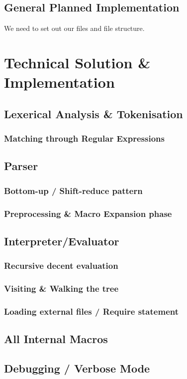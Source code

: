 \documentclass{article}
\begin{document}
    \clearpage
  \subsection{General Planned Implementation}
    We need to set out our files and file structure.


\section{Technical Solution \& Implementation}
  \subsection{Lexerical Analysis \& Tokenisation}
    \subsubsection{Matching through Regular Expressions}
  \subsection{Parser}
    \subsubsection{Bottom-up / Shift-reduce pattern}
    \subsubsection{Preprocessing \& Macro Expansion phase}
  \subsection{Interpreter/Evaluator}
    \subsubsection{Recursive decent evaluation}
    \subsubsection{Visiting \& Walking the tree}
    \subsubsection{Loading external files / Require statement}
  \subsection{All Internal Macros}
  \subsection{Debugging / Verbose Mode}
\end{document}
